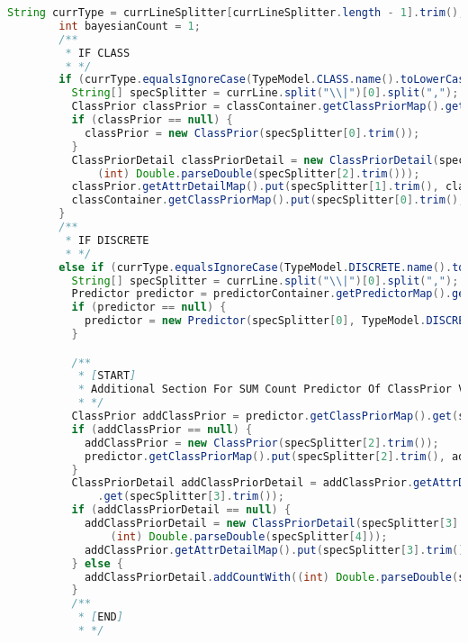 \begin{lstlisting}[language=Java,basicstyle=\tiny,caption=TestingMapper.java]
        String currType = currLineSplitter[currLineSplitter.length - 1].trim();
        int bayesianCount = 1;
        /**
         * IF CLASS
         * */
        if (currType.equalsIgnoreCase(TypeModel.CLASS.name().toLowerCase())) {
          String[] specSplitter = currLine.split("\\|")[0].split(",");
          ClassPrior classPrior = classContainer.getClassPriorMap().get(specSplitter[0].trim());
          if (classPrior == null) {
            classPrior = new ClassPrior(specSplitter[0].trim());
          }
          ClassPriorDetail classPriorDetail = new ClassPriorDetail(specSplitter[1].trim(),
              (int) Double.parseDouble(specSplitter[2].trim()));
          classPrior.getAttrDetailMap().put(specSplitter[1].trim(), classPriorDetail);
          classContainer.getClassPriorMap().put(specSplitter[0].trim(), classPrior);
        }
        /**
         * IF DISCRETE
         * */
        else if (currType.equalsIgnoreCase(TypeModel.DISCRETE.name().toLowerCase())) {
          String[] specSplitter = currLine.split("\\|")[0].split(",");
          Predictor predictor = predictorContainer.getPredictorMap().get(specSplitter[0].trim());
          if (predictor == null) {
            predictor = new Predictor(specSplitter[0], TypeModel.DISCRETE);
          }

          /**
           * [START]
           * Additional Section For SUM Count Predictor Of ClassPrior Value
           * */
          ClassPrior addClassPrior = predictor.getClassPriorMap().get(specSplitter[2].trim());
          if (addClassPrior == null) {
            addClassPrior = new ClassPrior(specSplitter[2].trim());
            predictor.getClassPriorMap().put(specSplitter[2].trim(), addClassPrior);
          }
          ClassPriorDetail addClassPriorDetail = addClassPrior.getAttrDetailMap()
              .get(specSplitter[3].trim());
          if (addClassPriorDetail == null) {
            addClassPriorDetail = new ClassPriorDetail(specSplitter[3].trim(),
                (int) Double.parseDouble(specSplitter[4]));
            addClassPrior.getAttrDetailMap().put(specSplitter[3].trim(), addClassPriorDetail);
          } else {
            addClassPriorDetail.addCountWith((int) Double.parseDouble(specSplitter[4]));
          }
          /**
           * [END]
           * */


\end{lstlisting}
